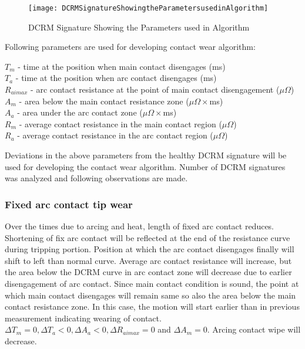 \begin{figure}[!htbp]
    \centering
    \texttt{[image: DCRMSignatureShowingtheParametersusedinAlgorithm]}
    \caption{DCRM Signature Showing the Parameters used in Algorithm}
    \label{fig:DCRM Signature Showing the Parameters used in Algorithm}
\end{figure}

Following parameters are used for developing contact wear algorithm:

$T_m$ - time at the position when main contact disengages (ms)\\
$T_a$ - time at the position when arc contact disengages (ms)\\
$R_{aimax}$ - arc contact resistance at the point of main contact disengagement ($\mu \Omega$)\\
$A_m$ - area below the main contact resistance zone ($\mu \Omega \times$ms)\\
$A_a$ - area under the arc contact zone ($\mu \Omega \times$ms)\\
$R_m$ - average contact resistance in the main contact region ($\mu \Omega$)\\
$R_a$ - average contact resistance in the arc contact region ($\mu \Omega$)

Deviations in the above parameters from the healthy DCRM signature will be used for developing the contact wear algorithm. Number of DCRM signatures was analyzed and following observations are made. 

\subsubsection*{Fixed arc contact tip wear}
Over the times due to arcing and heat, length of fixed arc contact reduces. Shortening of fix arc contact will be reflected at the end of the resistance curve during tripping portion. Position at which the arc contact disengages finally will shift to left than normal curve. Average arc contact resistance will increase, but the area below the DCRM curve in arc contact zone will decrease due to earlier disengagement of arc contact. Since main contact condition is sound, the point at which main contact disengages will remain same so also the area below the main contact resistance zone. In this case, the motion will start earlier than in previous measurement indicating wearing of contact.$\Delta T_m = 0, \Delta T_a < 0, \Delta A_a < 0, \Delta R_{aimax} = 0$ and $\Delta A_m = 0$. Arcing contact wipe will decrease.

